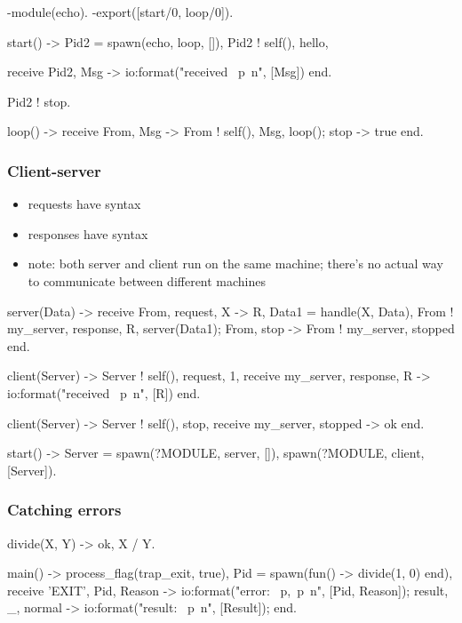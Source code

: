 \documentclass[a4paper,landscape,10pt]{article}
\begin{document}
\begin{multicols*}{2}
  \begin{erlang}
-module(echo).
-export([start/0, loop/0]).

start() ->
  Pid2 = spawn(echo, loop, []),
  Pid2 ! {self(), hello},

  receive
    {Pid2, Msg} -> io:format("received ~p~n", [Msg])
  end.

Pid2 ! stop.

loop() ->
  receive
    {From, Msg} ->
      From ! {self(), Msg},
    loop();
    stop ->
      true
  end.
\end{erlang}

  \breakcolumn

  \subsubsection{Client-server}

  \begin{itemize}
    \item requests have syntax 
    \item responses have syntax 
    \item note: both server and client run on the same machine; there's no actual way to communicate between different machines
  \end{itemize}

  \begin{erlang}
server(Data) ->
  receive
    {From, {request, X}} ->
      {R, Data1} = handle(X, Data),
      From ! {my_server, {response, R}},
      server(Data1);
    {From, stop} ->
      From ! {my_server, stopped}
  end.

client(Server) ->
  Server ! {self(), {request, 1}},
  receive
    {my_server, {response, R}} ->
      io:format("received ~p~n", [R])
  end.

client(Server) ->
  Server ! {self(), stop},
  receive
    {my_server, stopped} -> ok
  end.

start() ->
  Server = spawn(?MODULE, server, []),
  spawn(?MODULE, client, [Server]).
\end{erlang}

  \breakcolumn

  \subsubsection{Catching errors}

  \begin{erlang}

  divide(X, Y) ->
    {ok, X / Y}.

  main() ->
    process_flag(trap_exit, true), %
    Pid = spawn(fun() -> divide(1, 0) end),
    receive
      {'EXIT', Pid, Reason} -> %
        io:format("error: ~p,~p~n", [Pid, Reason]);
      {result, _, normal} ->  %
        io:format("result: ~p~n", [Result]);
    end.
\end{erlang}

\end{multicols*}
\end{document}

